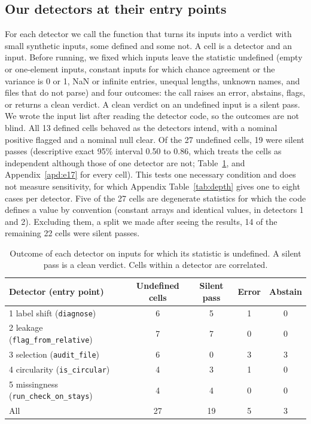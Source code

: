 \documentclass[10pt]{article}
\theoremstyle{definition}
\begin{document}
\subsection{Our detectors at their entry points}

For each detector we call the function that turns its inputs into a verdict with small synthetic inputs, some defined and some not. A cell is a detector and an input. Before running, we fixed which inputs leave the statistic undefined (empty or one-element inputs, constant inputs for which chance agreement or the variance is 0 or 1, NaN or infinite entries, unequal lengths, unknown names, and files that do not parse) and four outcomes: the call raises an error, abstains, flags, or returns a clean verdict. A clean verdict on an undefined input is a silent pass. We wrote the input list after reading the detector code, so the outcomes are not blind. All 13 defined cells behaved as the detectors intend, with a nominal positive flagged and a nominal null clear. Of the 27 undefined cells, 19 were silent passes (descriptive exact 95\% interval 0.50 to 0.86, which treats the cells as independent although those of one detector are not; Table~\ref{tab:e17}, and Appendix~\ref{apd:e17} for every cell). This tests one necessary condition and does not measure sensitivity, for which Appendix Table~\ref{tab:depth} gives one to eight cases per detector. Five of the 27 cells are degenerate statistics for which the code defines a value by convention (constant arrays and identical values, in detectors 1 and 2). Excluding them, a split we made after seeing the results, 14 of the remaining 22 cells were silent passes.

\begin{table}[t]
\centering\footnotesize
\begin{tabular}{@{}lcccc@{}}
\toprule
Detector (entry point) & Undefined cells & Silent pass & Error & Abstain\\
\midrule
1 label shift (\texttt{diagnose}) & 6 & 5 & 1 & 0\\
2 leakage (\texttt{flag\_from\_relative}) & 7 & 7 & 0 & 0\\
3 selection (\texttt{audit\_file}) & 6 & 0 & 3 & 3\\
4 circularity (\texttt{is\_circular}) & 4 & 3 & 1 & 0\\
5 missingness (\texttt{run\_check\_on\_stays}) & 4 & 4 & 0 & 0\\
\midrule
All & 27 & 19 & 5 & 3\\
\bottomrule
\end{tabular}
\caption{Outcome of each detector on inputs for which its statistic is undefined. A silent pass is a clean verdict. Cells within a detector are correlated.}
\label{tab:e17}
\end{table}
\end{document}
